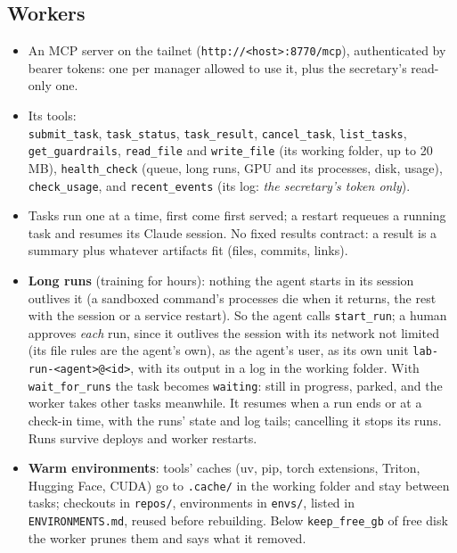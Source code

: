 \documentclass[11pt]{article}
\newcommand{\code}[1]{\texttt{#1}}
\begin{document}
\subsection{Workers}
\begin{itemize}
  \item An MCP server on the tailnet (\code{http://<host>:8770/mcp}), authenticated by
    bearer tokens: one per manager allowed to use it, plus the secretary's read-only one.
  \item Its tools:\\ \code{submit\_task}, \code{task\_status}, \code{task\_result},
    \code{cancel\_task}, \code{list\_tasks}, \code{get\_guardrails}, \code{read\_file}
    and \code{write\_file} (its working folder, up to 20 MB), \code{health\_check}
    (queue, long runs, GPU and its processes, disk, usage), \code{check\_usage}, and
    \code{recent\_events} (its log: \emph{the secretary's token only}).
  \item Tasks run one at a time, first come first served; a restart requeues a running
    task and resumes its Claude session. No fixed results contract: a result is a summary
    plus whatever artifacts fit (files, commits, links).
  \item \textbf{Long runs} (training for hours): nothing the agent starts in its session
    outlives it (a sandboxed command's processes die when it returns, the rest with the
    session or a service restart). So the agent calls \code{start\_run}; a human approves
    \emph{each} run, since it outlives the session with its network not limited (its
    file rules are the agent's own), as the agent's user, as its own
    unit \code{lab-run-<agent>@<id>}, with its output in a log in the working folder. With
    \code{wait\_for\_runs} the task becomes \code{waiting}: still in progress, parked, and
    the worker takes other tasks meanwhile. It resumes when a run ends or at a check-in
    time, with the runs' state and log tails; cancelling it stops its runs. Runs survive
    deploys and worker restarts.
  \item \textbf{Warm environments}: tools' caches (uv, pip, torch extensions, Triton,
    Hugging Face, CUDA) go to \code{.cache/} in the working folder and stay between
    tasks; checkouts in \code{repos/}, environments in \code{envs/}, listed in
    \code{ENVIRONMENTS.md}, reused before rebuilding. Below \code{keep\_free\_gb} of free
    disk the worker prunes them and says what it removed.
\end{itemize}
\end{document}
